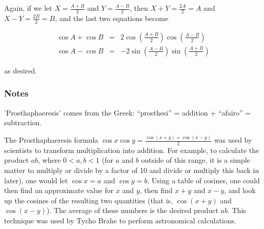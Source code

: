 \documentclass[12pt]{article}
\begin{document}
Again, if we let $X = \frac{A+B}{2}$ and $Y = \frac{A-B}{2}$, then $X+Y = \frac{2A}{2} = A$ and $X-Y = \frac{2B}{2} = B$, and the last two equations become

\begin{eqnarray*}
\cos A + \cos B &=& 2 \cos \left( \frac{A+B}{2} \right) \cos \left (\frac{A-B}{2} \right) \\
\cos A - \cos B &=& - 2 \sin \left( \frac{A-B}{2} \right) \sin \left (\frac{A+B}{2} \right)
\end{eqnarray*}

as desired.

\subsubsection*{Notes} 
'Prosthaphaeresis' comes from the Greek: ``prosthesi'' = addition + ``afairo'' = subtraction. 

The Prosthaphaeresis formula 
$\cos x \cos y = \frac{\cos (x+y) + \cos (x-y)}{2}$ 
was used by scientists to transform multiplication into addition.  For example, to calculate the product $ab$, where $0 < a, b < 1$ (for $a$ and $b$ outside of this range, it is a simple matter to multiply or divide by a factor of 10 and divide or multiply this back in later), one would let $\cos x = a$ and $\cos y = b$.  Using a table of cosines, one could then find an approximate value for $x$ and $y$, then find $x+y$ and $x-y$, and look up the cosines of the resulting two quantities (that is, $\cos (x+y)$ and $\cos (x-y)$).  The average of these numbers is the desired product $ab$.  This technique was used by Tycho Brahe to perform astronomical calculations.
\end{document}
